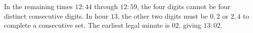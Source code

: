 In the remaining times $12:44$ through $12:59$, the four digits cannot be four distinct consecutive digits. In hour $13$, the other two digits must be $0,2$ or $2,4$ to complete a consecutive set. The earliest legal minute is $02$, giving $\boxed{13:02}$.

